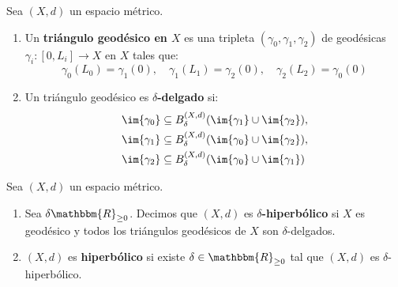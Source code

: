 \documentclass[12pt]{report}
\theoremstyle{largebreak}
\newcommand\cf[3]{\ensuremath{#1:#2\rightarrow#3}}
\newcommand{\bbm}[1]{\ensuremath{\mathbbm{#1}}}
\begin{document}
    \begin{mydef}
        Sea $(X,d)$ un espacio métrico.
        \begin{enumerate}[label = \textit{\arabic*}]
            \item Un \textbf{triángulo geodésico en $X$} es una tripleta $(\gamma_0,\gamma_1,\gamma_2)$ de geodésicas $\cf{\gamma_i}{[0,L_i]}{X}$ en $X$ tales que:
            \begin{equation*}
                \gamma_0(L_0)=\gamma_1(0),\quad \gamma_1(L_1)=\gamma_2(0),\quad \gamma_2(L_2)=\gamma_0(0)
            \end{equation*}
            \item Un triángulo geodésico es \textbf{$\delta$-delgado} si:
            \begin{equation*}
                \begin{split}
                    \im{\gamma_0}&\subseteq B_{\delta}^{(X,d)}(\im{\gamma_1}\cup\im{\gamma_2}),\\
                    \im{\gamma_1}&\subseteq B_{\delta}^{(X,d)}(\im{\gamma_0}\cup\im{\gamma_2}),\\
                    \im{\gamma_2}&\subseteq B_{\delta}^{(X,d)}(\im{\gamma_0}\cup\im{\gamma_1})\\
                \end{split}
            \end{equation*}
        \end{enumerate}
    \end{mydef}

    \begin{exa}
        
    \end{exa}

    \begin{mydef}
        Sea $(X,d)$ un espacio métrico.
        \begin{enumerate}[label = \textit{(\arabic*)}]
            \item Sea $\delta\bbm{R}_{\geq0}$. Decimos que $(X,d)$ es \textbf{$\delta$-hiperbólico} si $X$ es geodésico y todos los triángulos geodésicos de $X$ son $\delta$-delgados.
            \item $(X,d)$ es \textbf{hiperbólico} si existe $\delta\in\bbm{R}_{\geq0}$ tal que $(X,d)$ es $\delta$-hiperbólico.
        \end{enumerate}
    \end{mydef}
\end{document}
